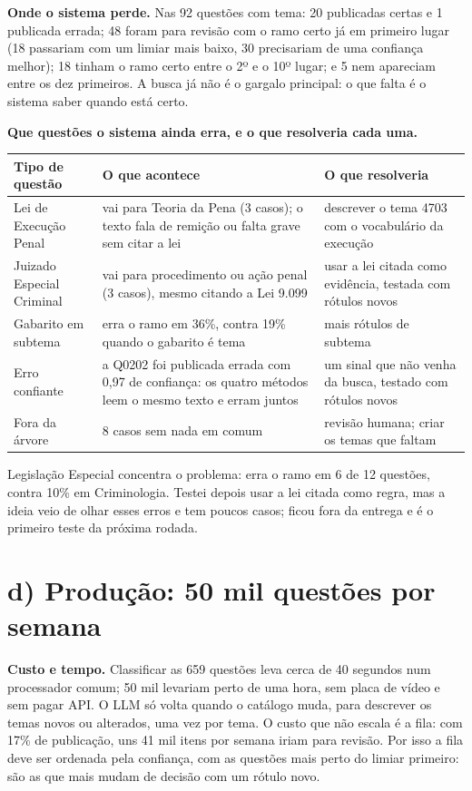 \documentclass[11pt,a4paper]{article}
\newcommand{\bd}[1]{\textbf{#1}}
\begin{document}
\bd{Onde o sistema perde.} Nas 92 questões com tema: 20 publicadas certas e 1 publicada errada;
48 foram para revisão com o ramo certo já em primeiro lugar (18 passariam com um limiar mais baixo,
30 precisariam de uma confiança melhor); 18 tinham o ramo certo entre o 2º e o 10º lugar; e 5 nem
apareciam entre os dez primeiros. A busca já não é o gargalo principal: o que falta é o sistema
saber quando está certo.

\bd{Que questões o sistema ainda erra, e o que resolveria cada uma.}

\begin{center}
\small
\begin{tabular}{p{3.6cm}p{6.0cm}p{6.2cm}}
\toprule
Tipo de questão & O que acontece & O que resolveria \\
\midrule
Lei de Execução Penal & vai para Teoria da Pena (3 casos); o texto fala de remição ou falta
grave sem citar a lei & descrever o tema 4703 com o vocabulário da execução \\
Juizado Especial Criminal & vai para procedimento ou ação penal (3 casos), mesmo citando a Lei
9.099 & usar a lei citada como evidência, testada com rótulos novos \\
Gabarito em subtema & erra o ramo em 36\%, contra 19\% quando o gabarito é tema & mais rótulos
de subtema \\
Erro confiante & a Q0202 foi publicada errada com 0,97 de confiança: os quatro métodos leem o
mesmo texto e erram juntos & um sinal que não venha da busca, testado com rótulos novos \\
Fora da árvore & 8 casos sem nada em comum & revisão humana; criar os temas que faltam \\
\bottomrule
\end{tabular}
\end{center}

Legislação Especial concentra o problema: erra o ramo em 6 de 12 questões, contra 10\% em
Criminologia. Testei depois usar a lei citada como regra, mas a ideia veio de olhar esses erros e
tem poucos casos; ficou fora da entrega e é o primeiro teste da próxima rodada.

\section{d) Produção: 50 mil questões por semana}

\bd{Custo e tempo.} Classificar as 659 questões leva cerca de 40 segundos num processador comum;
50 mil levariam perto de uma hora, sem placa de vídeo e sem pagar API. O LLM só volta quando o
catálogo muda, para descrever os temas novos ou alterados, uma vez por tema. O custo que não escala
é a fila: com 17\% de publicação, uns 41 mil itens por semana iriam para revisão. Por isso a fila
deve ser ordenada pela confiança, com as questões mais perto do limiar primeiro: são as que mais
mudam de decisão com um rótulo novo.
\end{document}
